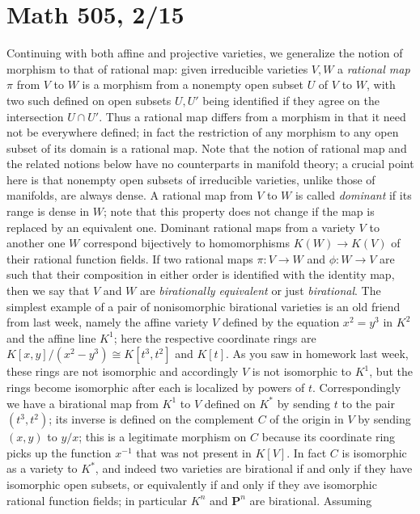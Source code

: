\documentclass[10pt]{article}
\begin{document}
\section*{Math 505, 2/15}

Continuing with both affine and projective varieties, we generalize the
notion of morphism to that of rational map: given irreducible varieties
$V,W$ a {\sl rational map} $\pi$ from $V$ to $W$ is a morphism from a
nonempty open subset $U$ of $V$ to $W$, with two such defined on open
subsets $U,U'$ being identified if they agree on the intersection $U\cap
U'$. Thus a rational map differs from a morphism in that it need not be
everywhere defined; in fact the restriction of any morphism to any open
subset of its domain is a rational map. Note that the notion of rational
map and the related notions below have no counterparts in manifold
theory; a crucial point here is that nonempty open subsets of
irreducible varieties, unlike those of manifolds, are always dense. A
rational map from $V$ to $W$ is called {\sl dominant} if its range is
dense in $W$; note that this property does not change if the map is
replaced by an equivalent one. Dominant rational maps from a variety $V$
to another one $W$ correspond bijectively to homomorphisms
$K(W)\rightarrow K(V)$ of their rational function fields. If two
rational maps $\pi:V\rightarrow W$ and $\phi:W\rightarrow V$ are such
that their composition in either order is identified with the identity
map, then we say that $V$ and $W$ are {\sl birationally equivalent} or
just {\sl birational}. The simplest example of a pair of nonisomorphic
birational varieties is an old friend from last week, namely the affine
variety $V$ defined by the equation $x^2 = y^3$ in $K^2$ and the affine
line $K^1$; here the respective coordinate rings are $K[x,y]/(x^2 -
y^3)\cong K[t^3,t^2]$ and $K[t]$. As you saw in homework last week,
these rings are not isomorphic and accordingly $V$ is not isomorphic to
$K^1$, but the rings become isomorphic after each is localized by powers
of $t$. Correspondingly we have a birational map from $K^1$ to $V$
defined on $K^*$ by sending $t$ to the pair $(t^3,t^2)$; its inverse is
defined on the complement $C$ of the origin in $V$ by sending $(x,y)$ to
$y/x$; this is a legitimate morphism on $C$ because its coordinate ring
picks up the function $x^{-1}$ that was not present in $K[V]$. In fact
$C$ is isomorphic as a variety to $K^*$, and indeed two varieties are
birational if and only if they have isomorphic open subsets, or
equivalently if and only if they ave isomorphic rational function
fields; in particular $K^n$ and $\mathbf P^n$ are birational. Assuming
\end{document}
